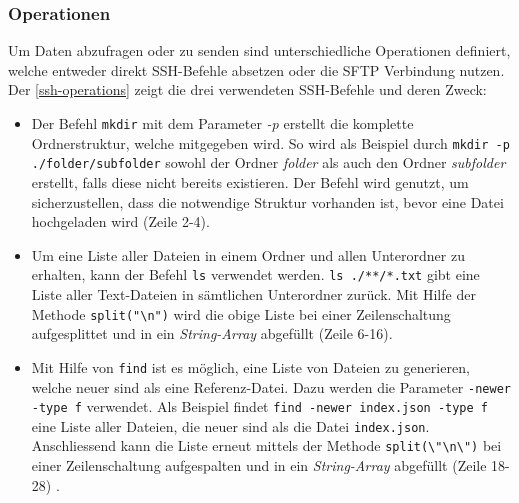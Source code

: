\subsubsection{Operationen}


Um Daten abzufragen oder zu senden sind unterschiedliche Operationen definiert, welche entweder direkt \gls{SSH}-Befehle absetzen oder die \gls{SFTP} Verbindung nutzen.
Der \autoref{ssh-operations} zeigt die drei verwendeten \gls{SSH}-Befehle und deren Zweck:
\begin{itemize}
    \item Der Befehl \texttt{mkdir} mit dem Parameter \textit{-p} erstellt die komplette Ordnerstruktur, welche mitgegeben wird. So wird als Beispiel durch \verb|mkdir -p ./folder/subfolder| sowohl der Ordner \textit{folder} als auch den Ordner \textit{subfolder} erstellt, falls diese nicht bereits existieren. Der Befehl wird genutzt, um sicherzustellen, dass die notwendige Struktur vorhanden ist, bevor eine Datei hochgeladen wird (Zeile 2-4).
    \item Um eine Liste aller Dateien in einem Ordner und allen Unterordner zu erhalten, kann der Befehl \texttt{ls} verwendet werden. \verb|ls ./**/*.txt| gibt eine Liste aller Text-Dateien in sämt\-lich\-en Unterordner zurück. Mit Hilfe der Methode \verb|split("\n")| wird die obige Liste bei einer Zeilenschaltung aufgesplittet und in ein \textit{String-Array} abgefüllt (Zeile 6-16).
    \item Mit Hilfe von \texttt{find} ist es möglich, eine Liste von Dateien zu generieren, welche neuer sind als eine Referenz-Datei. Dazu werden die Parameter \texttt{-newer -type f} verwendet. Als Beispiel findet \texttt{find -newer index.json -type f} eine Liste aller Dateien, die neuer sind als die Datei \texttt{index.json}. Anschliessend kann die Liste erneut mittels der Methode \verb|split(\"\n\")| bei einer Zeilenschaltung aufgespalten und in ein \textit{String-Array} abgefüllt (Zeile 18-28) .
\end{itemize}



